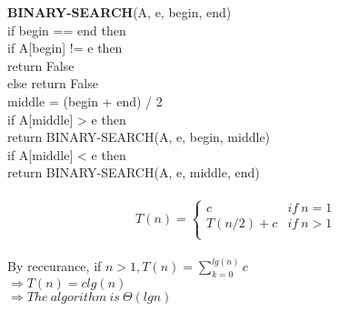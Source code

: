 \documentclass{article}
\begin{document}
\noindent\textbf{BINARY-SEARCH}(A, e, begin, end)\\
\indent if begin == end then\\
\indent \indent if A[begin] != e then \\
\indent \indent \indent return False\\
\indent \indent else return False\\
\indent middle = (begin + end) / 2\\
\indent if A[middle] > e then \\
\indent \indent \indent return BINARY-SEARCH(A, e, begin, middle)\\
\indent if A[middle] < e then\\
\indent \indent \indent return BINARY-SEARCH(A, e, middle, end)\\\\
\begin{equation}
T(n) =
\begin{cases} c &if \ n = 1\\
  T(n/2)  + c &if \ n > 1\\
\end{cases}
\end{equation}\\
\noindent By reccurance, if $n > 1, T(n) = \sum_{k=0}^{lg(n)}c$\\
$\Rightarrow T(n) = clg(n)$\\
$\Rightarrow The \ algorithm \ is \ \Theta(lgn)$
\end{document}
